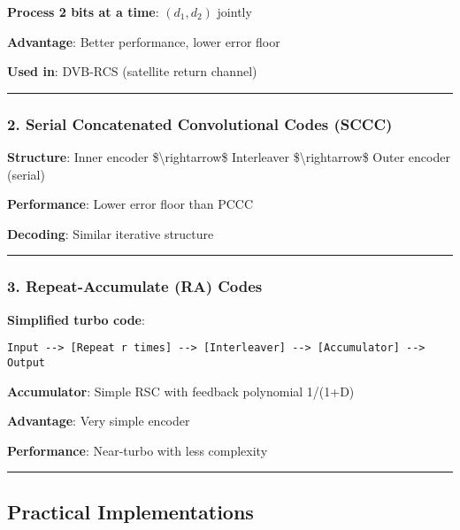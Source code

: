 \textbf{Process 2 bits at a time}: \((d_1, d_2)\) jointly

\textbf{Advantage}: Better performance, lower error floor

\textbf{Used in}: DVB-RCS (satellite return channel)

\begin{center}\rule{0.5\linewidth}{0.5pt}\end{center}

\subsubsection{2. Serial Concatenated Convolutional Codes
(SCCC)}\label{serial-concatenated-convolutional-codes-sccc}

\textbf{Structure}: Inner encoder \$\textbackslash rightarrow\$
Interleaver \$\textbackslash rightarrow\$ Outer encoder (serial)

\textbf{Performance}: Lower error floor than PCCC

\textbf{Decoding}: Similar iterative structure

\begin{center}\rule{0.5\linewidth}{0.5pt}\end{center}

\subsubsection{3. Repeat-Accumulate (RA)
Codes}\label{repeat-accumulate-ra-codes}

\textbf{Simplified turbo code}:

\begin{verbatim}
Input --> [Repeat r times] --> [Interleaver] --> [Accumulator] --> Output
\end{verbatim}

\textbf{Accumulator}: Simple RSC with feedback polynomial 1/(1+D)

\textbf{Advantage}: Very simple encoder

\textbf{Performance}: Near-turbo with less complexity

\begin{center}\rule{0.5\linewidth}{0.5pt}\end{center}

\subsection{Practical Implementations}\label{practical-implementations}

